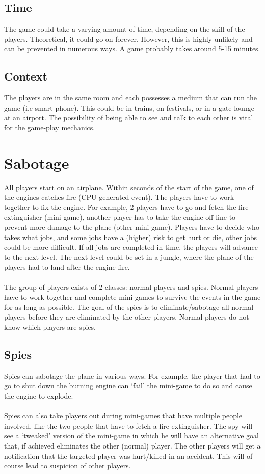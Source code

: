\documentclass{article}
\begin{document}
\subsection*{Time}
The game could take a varying amount of time, depending on the skill of the players. Theoretical, it could go on forever. However, this is highly unlikely and can be prevented in numerous ways. A game probably takes around 5-15 minutes.
\subsection*{Context}
The players are in the same room and each possesses a medium that can run the game (i.e smart-phone). This could be in trains, on festivals, or in a gate lounge at an airport. The possibility of being able to see and talk to each other is vital for the game-play mechanics.
\section{Sabotage}
All players start on an airplane. Within seconds of the start of the game, one of the engines catches fire (CPU generated event). The players have to work together to fix the engine. For example, 2 players have to go and fetch the fire extinguisher (mini-game), another player has to take the engine off-line to prevent more damage to the plane (other mini-game). Players have to decide who takes what jobs, and some jobs have a (higher) risk to get hurt or die, other jobs could be more difficult. If all jobs are completed in time, the players will advance to the next level. The next level could be set in a jungle, where the plane of the players had to land after the engine fire.\\\\
The group of players exists of 2 classes: normal players and spies. Normal players have to work together and complete mini-games to survive the events in the game for as long as possible. The goal of the spies is to eliminate/sabotage all normal players before they are eliminated by the other players. Normal players do not know which players are spies. 
\subsection*{Spies} 
Spies can sabotage the plane in various ways. For example, the player that had to go to shut down the burning engine can `fail' the mini-game to do so and cause the engine to explode.\\\\
Spies can also take players out during mini-games that have multiple people involved, like the two people that have to fetch a fire extinguisher. The spy will see a `tweaked'  version of the mini-game in which he will have an alternative goal that, if achieved eliminates the other (normal) player. The other players will get a notification that the targeted player was hurt/killed in an accident. This will of course lead to suspicion of other players.
\end{document}
